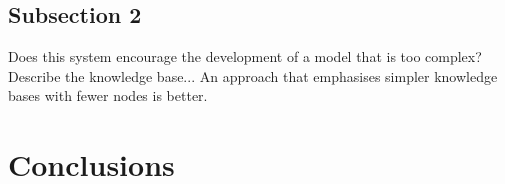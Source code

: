 
\subsection{Subsection 2}

Does this system encourage the development of a model that is too complex? Describe the knowledge base... An approach that emphasises simpler knowledge bases with fewer nodes is better.

\section{Conclusions}


